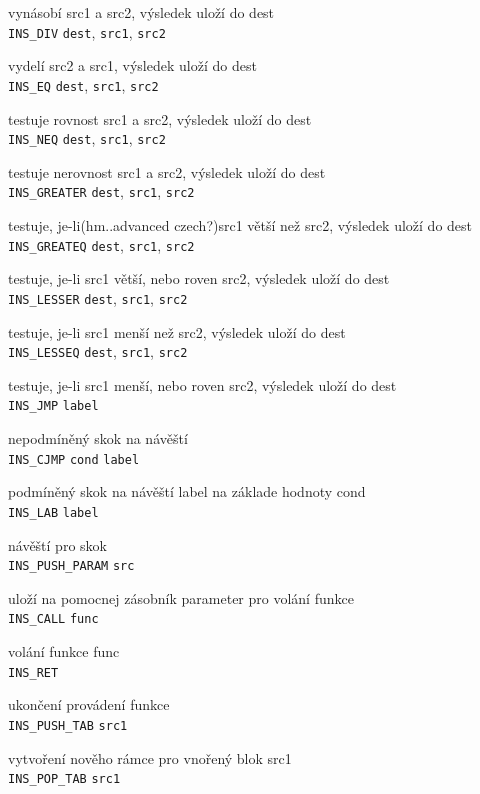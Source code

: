 \documentclass[a4paper, 12pt]{article}
\begin{document}
vynásobí src1 a src2, výsledek uloží do dest\\
\texttt{INS\_DIV} \texttt{dest}, \texttt{src1}, \texttt{src2}

vydelí src2 a src1, výsledek uloží do dest\\
\texttt{INS\_EQ} \texttt{dest}, \texttt{src1}, \texttt{src2}

testuje rovnost src1 a src2, výsledek uloží do dest\\
\texttt{INS\_NEQ} \texttt{dest}, \texttt{src1}, \texttt{src2}

testuje nerovnost src1 a src2, výsledek uloží do dest\\
\texttt{INS\_GREATER} \texttt{dest}, \texttt{src1}, \texttt{src2}

testuje, je-li(hm..advanced czech?)src1 větší než src2, výsledek uloží do dest\\
\texttt{INS\_GREATEQ} \texttt{dest}, \texttt{src1}, \texttt{src2}

testuje, je-li src1 větší, nebo roven src2, výsledek uloží do dest\\
\texttt{INS\_LESSER} \texttt{dest}, \texttt{src1}, \texttt{src2}

testuje, je-li src1 menší než src2, výsledek uloží do dest\\
\texttt{INS\_LESSEQ} \texttt{dest}, \texttt{src1}, \texttt{src2}

testuje, je-li src1 menší, nebo roven src2, výsledek uloží do dest\\
\texttt{INS\_JMP} \texttt{label}

nepodmíněný skok na návěští \\
\texttt{INS\_CJMP} \texttt{cond} \texttt{label}

podmíněný skok na návěští label na základe hodnoty cond\\
\texttt{INS\_LAB} \texttt{label}

návěští pro skok\\
\texttt{INS\_PUSH\_PARAM} \texttt{src}

uloží na pomocnej zásobník parameter pro volání funkce\\
\texttt{INS\_CALL} \texttt{func}

volání funkce func\\
\texttt{INS\_RET}

ukončení provádení funkce\\
\texttt{INS\_PUSH\_TAB} \texttt{src1}

vytvoření nověho rámce pro vnořený blok src1\\
\texttt{INS\_POP\_TAB} \texttt{src1}
\end{document}
